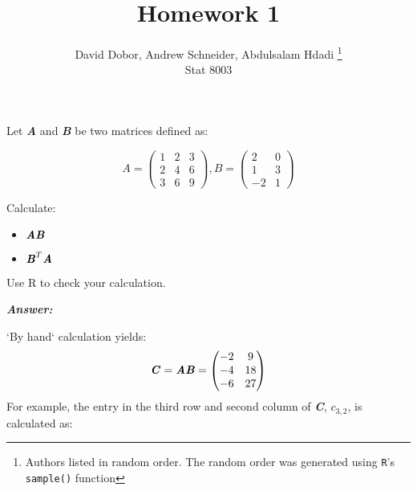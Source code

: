 \documentclass[12pt]{article}
\newcommand{\blditA}{\textbf{\textit{A}}}
\newcommand{\blditB}{\textbf{\textit{B}}}
\newcommand{\blditC}{\textbf{\textit{C}}}
\newenvironment{question}[2][Question]{\begin{trivlist}
\item[\hskip \labelsep {\bfseries #1}\hskip \labelsep {\bfseries #2.}]}{\end{trivlist}}
\begin{document}
 

 
\title{Homework 1}%
\author{David Dobor, Andrew Schneider,  Abdulsalam Hdadi 
\footnote{Authors listed in random order. The random order was generated using \texttt{R}'s \texttt{sample()} function}
\\ %
Stat 8003} %
 
\maketitle
 
 
\begin{question}{1.1} %
Let \blditA $ $ and \blditB $ $ be two matrices defined as:

\begin{equation*}
A = \begin{pmatrix}
  1 & 2 & 3\\
  2 & 4 & 6\\
  3 & 6 & 9
\end{pmatrix},
B = \begin{pmatrix}
  2 & 0\\
  1 & 3\\
 -2 & 1
\end{pmatrix}
\end{equation*}

Calculate:

\begin{itemize}
  \item $\blditA \blditB$
  \item $\blditB^T \blditA $
\end{itemize}

Use R to check your calculation.

 \end{question}
 
 
 \textbf{\emph{Answer:} }
 
`By hand` calculation yields:
\begin{equation*}
\blditC  = \blditA \blditB = 
\begin{pmatrix}
  -2 & 9\\
  -4 & 18\\
  -6 & 27
\end{pmatrix}
\end{equation*}
 For example, the entry in the third row and second column of \blditC, $c_{3,2}$, is calculated as:
 
\end{document}

